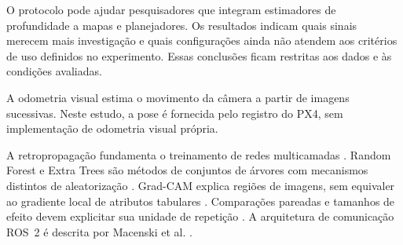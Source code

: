 O protocolo pode ajudar pesquisadores que integram estimadores de profundidade a mapas e planejadores. Os resultados indicam quais sinais merecem mais investigação e quais configurações ainda não atendem aos critérios de uso definidos no experimento. Essas conclusões ficam restritas aos dados e às condições avaliadas.


A odometria visual estima o movimento da câmera a partir de imagens sucessivas. Neste estudo, a pose é fornecida pelo registro do PX4, sem implementação de odometria visual própria.





A retropropagação fundamenta o treinamento de redes multicamadas \cite{Rumelhart1986}. Random Forest e Extra Trees são métodos de conjuntos de árvores com mecanismos distintos de aleatorização \cite{Breiman2001,Geurts2006}. Grad-CAM explica regiões de imagens, sem equivaler ao gradiente local de atributos tabulares \cite{Selvaraju2017}. Comparações pareadas e tamanhos de efeito devem explicitar sua unidade de repetição \cite{Lakens2013}. A arquitetura de comunicação ROS~2 é descrita por Macenski et al. \cite{Macenski2022}.
